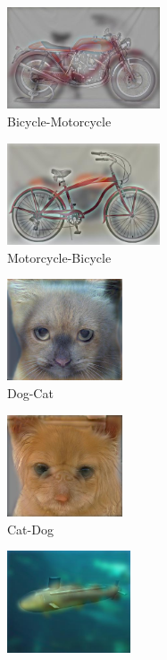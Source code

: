 \documentclass{bmvc2k}
\begin{document}
\begin{figure}[h!]
  \centering
  \begin{subfigure}[b]{0.3\linewidth}
    \includegraphics[width=\linewidth, height=3cm]{images/Bicycle_Motorcycle/hybrid_image_bicycle_motorcycle.jpg}
     \caption{Bicycle-Motorcycle}
  \end{subfigure}
  \begin{subfigure}[b]{0.3\linewidth}
    \includegraphics[width=\linewidth, height=3cm]{images/Motorcycle_Bicycle/hybrid_image_motorcycle_bicycle.jpg}
     \caption{Motorcycle-Bicycle}
  \end{subfigure}
  \begin{subfigure}[b]{0.3\linewidth}
    \includegraphics[width=\linewidth, height=3cm]{images/Dog_Cat/hybrid_image_dog_cat.jpg}
    \caption{Dog-Cat}
  \end{subfigure}
  \begin{subfigure}[b]{0.3\linewidth}
    \includegraphics[width=\linewidth, height=3cm]{images/Cat_Dog/hybrid_image_cat_dog.jpg}
    \caption{Cat-Dog}
  \end{subfigure}
  \begin{subfigure}[b]{0.3\linewidth}
    \includegraphics[width=\linewidth, height=3cm]{images/Fish_Sub/hybrid_image_fish_submarine.jpg}

\end{subfigure}
\end{figure}
\end{document}
